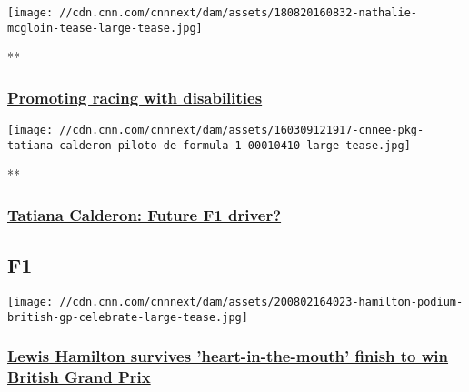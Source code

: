 \href{/videos/sports/2018/08/20/nathalie-mcgloin-disability-women-in-motorsport-fia-circuit-spt-intl.cnn}{}

\texttt{[image: //cdn.cnn.com/cnnnext/dam/assets/180820160832-nathalie-mcgloin-tease-large-tease.jpg]}

**

\hypertarget{promoting-racing-with-disabilities}{%
\subsubsection{\texorpdfstring{\href{/videos/sports/2018/08/20/nathalie-mcgloin-disability-women-in-motorsport-fia-circuit-spt-intl.cnn}{Promoting
racing with
disabilities}}{Promoting racing with disabilities}}\label{promoting-racing-with-disabilities}}

\href{/videos/sports/2018/08/20/tatiana-calderon-colombia-gp3-alfa-romeo-sauber-women-in-motorsport-formula-one-circuit-spt-intl.cnn}{}

\texttt{[image: //cdn.cnn.com/cnnnext/dam/assets/160309121917-cnnee-pkg-tatiana-calderon-piloto-de-formula-1-00010410-large-tease.jpg]}

**

\hypertarget{tatiana-calderon-future-f1-driver}{%
\subsubsection{\texorpdfstring{\href{/videos/sports/2018/08/20/tatiana-calderon-colombia-gp3-alfa-romeo-sauber-women-in-motorsport-formula-one-circuit-spt-intl.cnn}{Tatiana
Calderon: Future F1
driver?}}{Tatiana Calderon: Future F1 driver?}}\label{tatiana-calderon-future-f1-driver}}

\hypertarget{f1-}{%
\subsection{F1~}\label{f1-}}

\href{/2020/08/02/motorsport/lewis-hamilton-formula-one-british-grand-prix-motorsport-spt-intl/index.html}{}

\texttt{[image: //cdn.cnn.com/cnnnext/dam/assets/200802164023-hamilton-podium-british-gp-celebrate-large-tease.jpg]}

\hypertarget{lewis-hamilton-survives-heart-in-the-mouth-finish-to-win-british-grand-prix-}{%
\subsubsection{\texorpdfstring{\href{/2020/08/02/motorsport/lewis-hamilton-formula-one-british-grand-prix-motorsport-spt-intl/index.html}{Lewis
Hamilton survives 'heart-in-the-mouth' finish to win British Grand Prix
}}{Lewis Hamilton survives 'heart-in-the-mouth' finish to win British Grand Prix }}\label{lewis-hamilton-survives-heart-in-the-mouth-finish-to-win-british-grand-prix-}}

